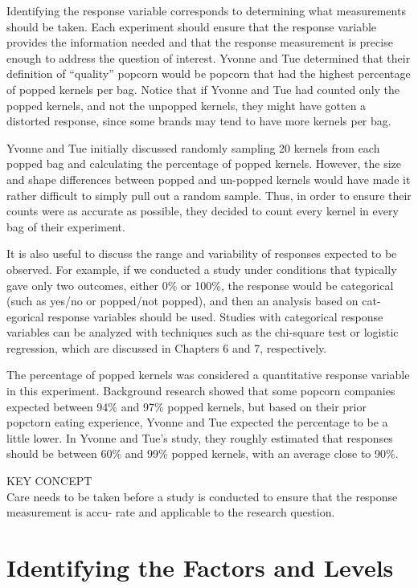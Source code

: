 \documentclass[
]{report}
\begin{document}
Identifying the response variable corresponds to determining what measurements should be taken. Each
experiment should ensure that the response variable provides the information needed and that the response
measurement is precise enough to address the question of interest. Yvonne and Tue determined that their
definition of ``quality'' popcorn would be popcorn that had the highest percentage of popped kernels per bag.
Notice that if Yvonne and Tue had counted only the popped kernels, and not the unpopped kernels, they might
have gotten a distorted response, since some brands may tend to have more kernels per bag.

Yvonne and Tue initially discussed randomly sampling 20 kernels from each popped bag and calculating the percentage of popped kernels. However, the size and shape differences between popped and
un-popped kernels would have made it rather difficult to simply pull out a random sample. Thus, in order
to ensure their counts were as accurate as possible, they decided to count every kernel in every bag of their
experiment.

It is also useful to discuss the range and variability of responses expected to be observed. For example,
if we conducted a study under conditions that typically gave only two outcomes, either 0\% or 100\%, the
response would be categorical (such as yes/no or popped/not popped), and then an analysis based on cat-
egorical response variables should be used. Studies with categorical response variables can be analyzed
with techniques such as the chi-square test or logistic regression, which are discussed in Chapters 6 and 7,
respectively.

The percentage of popped kernels was considered a quantitative response variable in this experiment.
Background research showed that some popcorn companies expected between 94\% and 97\% popped kernels,
but based on their prior popctorn eating experience, Yvonne and Tue expected the percentage to be a little
lower. In Yvonne and Tue's study, they roughly estimated that responses should be between 60\% and 99\%
popped kernels, with an average close to 90\%.

KEY CONCEPT\\
Care needs to be taken before a study is conducted to ensure that the response measurement is accu-
rate and applicable to the research question.

\section{Identifying the Factors and Levels}\label{identifying-the-factors-and-levels}
\end{document}
